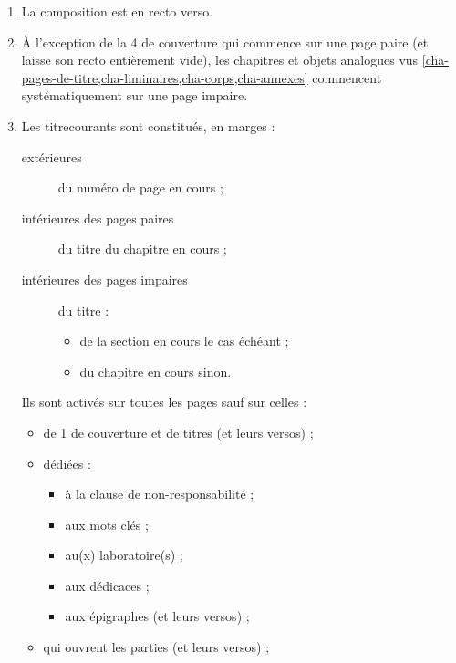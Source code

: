 \begin{enumerate}
\item La composition est en recto verso\exceptoneside.
\item À l'exception de la 4\ieme{} de
  couverture qui commence sur
  une page paire (et laisse
  son recto entièrement vide), les chapitres et objets analogues vus
  \vref{cha-pages-de-titre,cha-liminaires,cha-corps,cha-annexes} commencent
  systématiquement sur une page impaire\exceptoneside.
\item Les \glspl{titrecourant} sont constitués, en marges  :
  \begin{description}
  \item[extérieures] du numéro de page en cours ;
  \item[intérieures des pages paires] du
    titre\titresnormalalternatif{} du chapitre en cours ;
  \item[intérieures des pages impaires] du titre\titresnormalalternatif{} :
    \begin{itemize}
    \item de la section en cours le cas échéant ;
    \item du chapitre en cours sinon.
    \end{itemize}
  \end{description}
  Ils sont activés sur toutes les pages sauf sur celles :
  \begin{itemize}
  \item de 1\iere{} de couverture
    et de titres (et leurs versos) ;
  \item dédiées :
    \begin{itemize}
    \item à la clause de non-responsabilité ;
    \item aux mots clés ;
    \item au(x) laboratoire(s) ;
    \item aux dédicaces ;
    \item aux épigraphes (et leurs versos) ;
    \end{itemize}
  \item qui ouvrent les parties (et leurs versos) ;

\end{itemize}
\end{enumerate}
